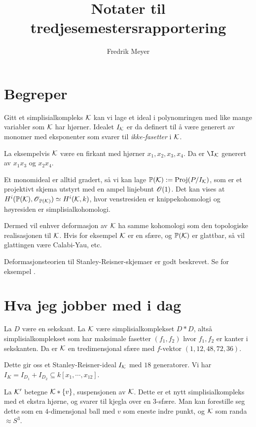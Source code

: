 \documentclass[11pt, norsk]{article}
\begin{document}
\title{Notater til tredjesemestersrapportering}
\author{Fredrik Meyer}
\maketitle 

\section{Begreper}

Gitt et simplisialkompleks $\mathcal K$ kan vi lage et ideal i polynomringen med like mange variabler som $\mathcal K$ har hjørner. Idealet $I_\mathcal K$ er da definert til å være generert av monomer med eksponenter som svarer til \emph{ikke-fasetter} i $\mathcal K$.

La eksempelvis $\mathcal K$ være en firkant med hjørner $x_1,x_2,x_3,x_4$. Da er $\I_\K$ generert av $x_1x_3$ og $x_2x_4$.

Et monomideal er alltid gradert, så vi kan lage $\mathbb{P}(\mathcal K) := \operatorname{Proj} (P/I_\mathcal K)$, som er et projektivt skjema utstyrt med en ampel linjebunt $\operatorname{\mathscr{O}}(1)$. Det kan vises at $H^i(\mathbb{P}(\mathcal K), \operatorname{\mathscr{O}}_{\mathbb{P}(\mathcal K)}) \simeq H^i(\mathcal K,k)$, hvor venstresiden er knippekohomologi og høyresiden er simplisialkohomologi.

Dermed vil enhver deformasjon av $\mathcal K$ ha samme kohomologi som den topologiske realisasjonen til $\mathcal K$. Hvis for eksempel $\mathcal K$ er en sfære, og $\mathbb{P}(\mathcal K)$ er glattbar, så vil glattingen være Calabi-Yau, etc.

Deformasjonsteorien til Stanley-Reisner-skjemaer er godt beskrevet. Se for eksempel \cite{deforming_christophersen}.

\section{Hva jeg jobber med i dag}

La $D$ være en sekskant. La $\mathcal K$ være simplisialkomplekset $D \ast D$, altså simplisialkomplekset som har maksimale fasetter $(f_1,f_2)$ hvor $f_1,f_2$ er kanter i sekskanten. Da er $\mathcal K$ en tredimensjonal sfære med $f$-vektor $(1, 12, 48, 72, 36)$. 

Dette gir oss et Stanley-Reisner-ideal $I_\mathcal K$ med $18$ generatorer. Vi har $I_K=I_{D_1} + I_{D_2} \subseteq k[x_1,\cdots,x_{12}]$.

La $\mathcal K'$ betegne $\mathcal K \ast \{v\}$, suspensjonen av $\mathcal K$. Dette er et nytt simplisialkompleks med et ekstra hjørne, og svarer til kjegla over en $3$-sfære. Man kan forestille seg dette som en $4$-dimensjonal ball med $v$ som eneste indre punkt, og $\mathcal K$ som randa $\approx S^3$.
\end{document}
